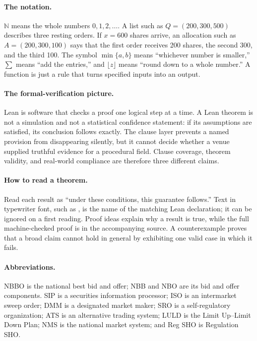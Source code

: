 \documentclass[11pt]{article}
\theoremstyle{definition}
\theoremstyle{remark}
\newcommand{\codeunderscore}{\char`\_\allowbreak}
\newcommand{\lean}[1]{\ifmmode\mathtt{#1}\else{\ttfamily\let\_\codeunderscore #1}\fi}
\newcommand{\N}{\mathbb{N}}
\begin{document}
\paragraph{The notation.} $\N$ means the whole numbers $0,1,2,\ldots$. A list such as $Q=(200,300,500)$ describes three resting orders. If $x=600$ shares arrive, an allocation such as $A=(200,300,100)$ says that the first order receives 200 shares, the second 300, and the third 100. The symbol $\min\{a,b\}$ means ``whichever number is smaller,'' $\sum$ means ``add the entries,'' and $\lfloor z\rfloor$ means ``round down to a whole number.'' A function is just a rule that turns specified inputs into an output.

\paragraph{The formal-verification picture.} Lean is software that checks a proof one logical step at a time. A Lean theorem is not a simulation and not a statistical confidence statement: if its assumptions are satisfied, its conclusion follows exactly. The clause layer prevents a named provision from disappearing silently, but it cannot decide whether a venue supplied truthful evidence for a procedural field. Clause coverage, theorem validity, and real-world compliance are therefore three different claims.

\paragraph{How to read a theorem.} Read each result as ``under these conditions, this guarantee follows.'' Text in typewriter font, such as \lean{priceTime\_sum\_le}, is the name of the matching Lean declaration; it can be ignored on a first reading. Proof ideas explain why a result is true, while the full machine-checked proof is in the accompanying source. A counterexample proves that a broad claim cannot hold in general by exhibiting one valid case in which it fails.

\paragraph{Abbreviations.} NBBO is the national best bid and offer; NBB and NBO are its bid and offer components. SIP is a securities information processor; ISO is an intermarket sweep order; DMM is a designated market maker; SRO is a self-regulatory organization; ATS is an alternative trading system; LULD is the Limit Up--Limit Down Plan; NMS is the national market system; and Reg SHO is Regulation SHO.
\end{document}

